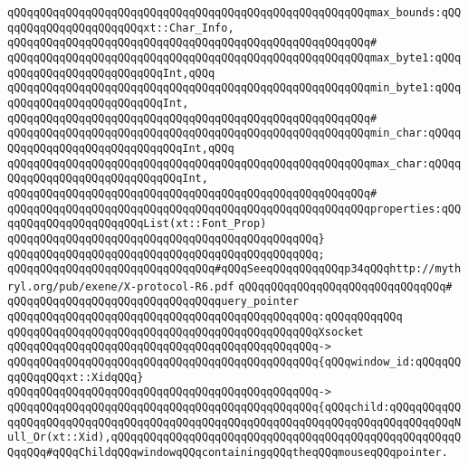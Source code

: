 \verb|qQQqqQQqqQQqqQQqqQQqqQQqqQQqqQQqqQQqqQQqqQQqqQQqqQQqqQQqmax_bounds:qQQqqQQqqQQqqQQqqQQqqQQqxt::Char_Info,|\newline
\verb|qQQqqQQqqQQqqQQqqQQqqQQqqQQqqQQqqQQqqQQqqQQqqQQqqQQqqQQq#|\newline
\verb|qQQqqQQqqQQqqQQqqQQqqQQqqQQqqQQqqQQqqQQqqQQqqQQqqQQqqQQqmax_byte1:qQQqqQQqqQQqqQQqqQQqqQQqqQQqInt,qQQq|\newline
\verb|qQQqqQQqqQQqqQQqqQQqqQQqqQQqqQQqqQQqqQQqqQQqqQQqqQQqqQQqmin_byte1:qQQqqQQqqQQqqQQqqQQqqQQqqQQqInt,|\newline
\verb|qQQqqQQqqQQqqQQqqQQqqQQqqQQqqQQqqQQqqQQqqQQqqQQqqQQqqQQq#|\newline
\verb|qQQqqQQqqQQqqQQqqQQqqQQqqQQqqQQqqQQqqQQqqQQqqQQqqQQqqQQqmin_char:qQQqqQQqqQQqqQQqqQQqqQQqqQQqqQQqInt,qQQq|\newline
\verb|qQQqqQQqqQQqqQQqqQQqqQQqqQQqqQQqqQQqqQQqqQQqqQQqqQQqqQQqmax_char:qQQqqQQqqQQqqQQqqQQqqQQqqQQqqQQqInt,|\newline
\verb|qQQqqQQqqQQqqQQqqQQqqQQqqQQqqQQqqQQqqQQqqQQqqQQqqQQqqQQq#|\newline
\verb|qQQqqQQqqQQqqQQqqQQqqQQqqQQqqQQqqQQqqQQqqQQqqQQqqQQqqQQqproperties:qQQqqQQqqQQqqQQqqQQqqQQqList(xt::Font_Prop)|\newline
\verb|qQQqqQQqqQQqqQQqqQQqqQQqqQQqqQQqqQQqqQQqqQQqqQQq}|\newline
\verb|qQQqqQQqqQQqqQQqqQQqqQQqqQQqqQQqqQQqqQQqqQQqqQQq;|\newline
\newline
\verb|qQQqqQQqqQQqqQQqqQQqqQQqqQQqqQQq#qQQqSeeqQQqqQQqqQQqp34qQQqhttp://mythryl.org/pub/exene/X-protocol-R6.pdf|\newline
\verb|qQQqqQQqqQQqqQQqqQQqqQQqqQQqqQQq#|\newline
\verb|qQQqqQQqqQQqqQQqqQQqqQQqqQQqqQQqquery_pointer|\newline
\verb|qQQqqQQqqQQqqQQqqQQqqQQqqQQqqQQqqQQqqQQqqQQqqQQq:qQQqqQQqqQQq|\newline
\verb|qQQqqQQqqQQqqQQqqQQqqQQqqQQqqQQqqQQqqQQqqQQqqQQqXsocket|\newline
\verb|qQQqqQQqqQQqqQQqqQQqqQQqqQQqqQQqqQQqqQQqqQQqqQQq->|\newline
\verb|qQQqqQQqqQQqqQQqqQQqqQQqqQQqqQQqqQQqqQQqqQQqqQQq{qQQqwindow_id:qQQqqQQqqQQqqQQqxt::XidqQQq}|\newline
\verb|qQQqqQQqqQQqqQQqqQQqqQQqqQQqqQQqqQQqqQQqqQQqqQQq->|\newline
\verb|qQQqqQQqqQQqqQQqqQQqqQQqqQQqqQQqqQQqqQQqqQQqqQQq{qQQqchild:qQQqqQQqqQQqqQQqqQQqqQQqqQQqqQQqqQQqqQQqqQQqqQQqqQQqqQQqqQQqqQQqqQQqqQQqqQQqqQQqNull_Or(xt::Xid),qQQqqQQqqQQqqQQqqQQqqQQqqQQqqQQqqQQqqQQqqQQqqQQqqQQqqQQqqQQq#qQQqChildqQQqwindowqQQqcontainingqQQqtheqQQqmouseqQQqpointer.|\newline
